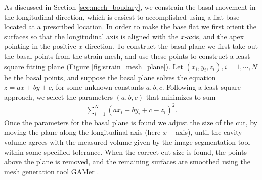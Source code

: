 As discussed in Section \ref{sec:mech_boudary}, we constrain the basal movement in
the longitudinal direction, which is easiest to accomplished using a flat
base located at a prescribed location. In order to make the base flat
we first orient the surfaces so that the longitudinal axis is aligned
with the $x$-axis, and the apex pointing in the positive $x$
direction. To construct the basal plane we first take out the basal
points from the strain mesh, and use these points to construct a least
square fitting plane (Figure \ref{fig:strain_mesh_plane}). Let $(x_i, y_i, z_i), i = 1, \cdots, N$
be the basal points, and suppose the basal plane solves the equation
$z = ax + by + c$, for some unknown constants $a,b,c$. Following a
least square approach, we select the parameters $(a,b,c)$ that
minimizes to sum
\begin{align}
  \sum_{i = 1}^{N} \left(ax_i + by_i + c  - z_i \right)^2.
\end{align}
Once the parameters for the basal plane is found we adjust the size of
the cut, by moving the plane along the longitudinal axis (here
$x-$axis), until the cavity volume agrees with the measured volume
given by the image segmentation tool within some specified tolerance. 
When the correct cut size is found, the points above the plane is removed,
and the remaining surfaces are smoothed using the mesh generation tool GAMer
\cite{yu2008feature}.

